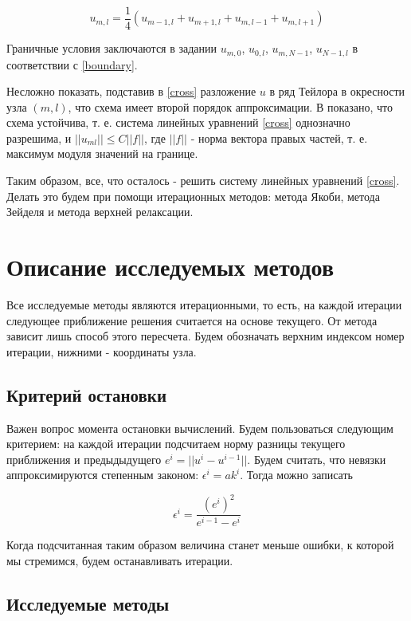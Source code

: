 \documentclass[report , a4paper, onecolumn, 12pt]{article}
\begin{document}
\begin{equation}
 \label{cross}u_{m, l} = \frac{1}{4}(u_{m - 1, l} + u_{m + 1, l} + u_{m,l-1} + u_{m, l+1})
\end{equation}

Граничные условия заключаются в задании $u_{m,0}$, $u_{0,l}$, $u_{m, N - 1}$, $u_{N - 1,l}$ в соответствии с \ref{boundary}.

Несложно показать, подставив в \ref{cross} разложение $u$ в ряд Тейлора в окресности узла $(m, l)$, что схема имеет второй порядок аппроксимации. В \cite{aristova} показано, что схема устойчива, т. е. система линейных уравнений \ref{cross} однозначно разрешима, и $||u_{ml}|| \le C ||f||$, где $||f||$ - норма вектора правых частей, т. е. максимум модуля значений на границе. 

Таким образом, все, что осталось - решить систему линейных уравнений \ref{cross}. Делать это будем при помощи итерационных методов: метода Якоби, метода Зейделя и метода верхней релаксации.

\section{Описание исследуемых методов}

Все исследуемые методы являются итерационными, то есть, на каждой итерации следующее приближение решения считается на основе текущего. От метода зависит лишь способ этого пересчета. Будем обозначать верхним индексом номер итерации, нижними - координаты узла.

\subsection{Критерий остановки}

Важен вопрос момента остановки вычислений. Будем пользоваться следующим критерием: на каждой итерации подсчитаем норму разницы текущего приближения и предыдыдущего $e^i = ||u^i - u^{i - 1}||$. Будем считать, что невязки аппроксимируются степенным законом: $\epsilon^i = a k^i$. Тогда можно записать

\begin{equation}
 \epsilon^i = \frac{(e^i)^2}{e^{i - 1} - e^i }
\end{equation}

Когда подсчитанная таким образом величина станет меньше ошибки, к которой мы стремимся, будем останавливать итерации.


\subsection{Исследуемые методы}
\end{document}
